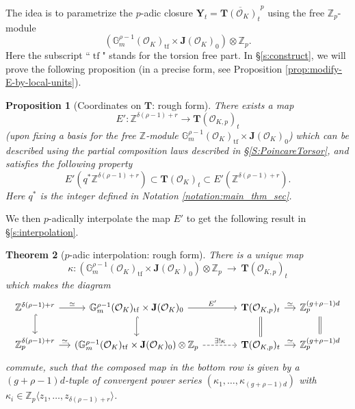 \documentclass[11pt,oneside]{amsart}
\theoremstyle{plain}
\newtheorem{theorem}{Theorem}[section]
\newtheorem{proposition}[theorem]{Proposition}
\theoremstyle{definition}
\def\lra{{\longrightarrow}}
\def\G{{\bf G}}
\DeclareMathOperator{\tf}{\mathrm{tf}}
\def\TT{\mathbf{T}}
\def\Z{\mathbb{Z}}
\def\J{\mathbf{J}}
\def\G{\mathbb{G}}
\def\Y{\mathbf{Y}}
\def\oh{\mathcal{O}}
\begin{document}
The idea is to parametrize the $p$-adic closure $\Y_t = \overline{\TT(\oh_K)_t}^p$ using the free $\Z_p$-module
\[
(\G_m^{\rho-1}(\oh_K)_{\tf} \times \J(\oh_K)_0)\otimes \Z_p.
\]
Here the subscript ``$\tf$" stands for the torsion free part. In \S \ref{s:construct}, we will prove the following proposition (in a precise form, see Proposition \ref{prop:modify-E-by-local-units}).
\begin{proposition}[Coordinates on $\TT$: rough form] \label{prop:pinterpolation}
There exists a map
\begin{equation}
    E' : \Z^{\delta(\rho-1)+r} \lra \TT(\oh_{K, p})_t
\end{equation}
(upon fixing a basis for the free $\Z$-module $\G_m^{\rho-1}(\oh_K)_{\tf} \times \J(\oh_K)_0$) which can be described using the partial composition laws described in \S \ref{S:PoincareTorsor}, and satisfies the following property 
\begin{equation}\label{eq:Eprop}
    E'(q^* \Z^{\delta(\rho-1)+r})\subset \TT(\oh_K)_t \subset E'(\Z^{\delta(\rho-1)+r}).
\end{equation}
Here $q^*$ is the integer defined in Notation \ref{notation:main_thm_sec}. 
\end{proposition}

We then $p$-adically interpolate the map $E'$ to get the following  result in \S \ref{s:interpolation}.
\begin{theorem}[$p$-adic interpolation: rough form]\label{thm:pinterpolation}
There is a unique map 
$$\kappa:  (\G_m^{\rho-1}(\oh_K)_{\tf} \times \J(\oh_K)_0)\otimes \Z_p  \: \lra \:  \TT (\oh_{K, p})_t  $$
 which makes the diagram
\[
\begin{tikzcd}[column sep = 1.2em]
\Z^{\delta(\rho-1)+r} \arrow{r}{\simeq} \arrow[hook]{d}
& \G_m^{\rho-1}(\oh_K)_{\tf} \times \J(\oh_K)_0 \arrow{rrr}{E'} \arrow[hook]{d}
&&& \TT(\oh_{K, p})_t \arrow{r}{\simeq} \arrow[equal]{d}
& \Z_p^{(g+\rho-1)d} \arrow[equal]{d} \\
\Z_p^{\delta(\rho-1)+r} \arrow{r}{\simeq}
& (\G_m^{\rho-1}(\oh_K)_{\tf} \times \J(\oh_K)_0)\otimes \Z_p \arrow[dashed]{rrr}{\exists ! \kappa} 
&&& \TT(\oh_{K, p})_t \arrow{r}{\simeq}
& \Z_p^{(g+\rho-1)d}
\end{tikzcd}
\]
commute, such that the composed map in the bottom row is given by a $(g+\rho-1)d$-tuple of convergent power series $(\kappa_1, \ldots, \kappa_{(g+\rho-1)d})$ with $\kappa_i\in \Z_p\langle z_1, \ldots, z_{\delta(\rho-1)+r} \rangle$.
\end{theorem}
\end{document}
